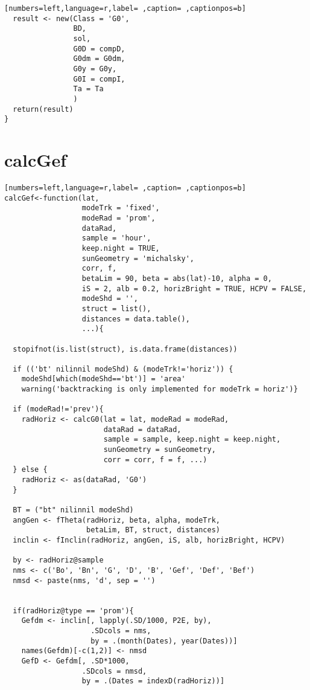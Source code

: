 \begin{lstlisting}[numbers=left,language=r,label= ,caption= ,captionpos=b]
  result <- new(Class = 'G0',
                BD,        
                sol,       
                G0D = compD, 
                G0dm = G0dm, 
                G0y = G0y,   
                G0I = compI, 
                Ta = Ta      
                )
  return(result)
}
\end{lstlisting}
\section{calcGef}
\label{sec:org979716a}
\begin{lstlisting}[numbers=left,language=r,label= ,caption= ,captionpos=b]
calcGef<-function(lat,
                  modeTrk = 'fixed',      
                  modeRad = 'prom', 
                  dataRad,
                  sample = 'hour',
                  keep.night = TRUE,
                  sunGeometry = 'michalsky',
                  corr, f,
                  betaLim = 90, beta = abs(lat)-10, alpha = 0,
                  iS = 2, alb = 0.2, horizBright = TRUE, HCPV = FALSE,
                  modeShd = '',    
                  struct = list(), 
                  distances = data.table(),
                  ...){

  stopifnot(is.list(struct), is.data.frame(distances))

  if (('bt' nilinnil modeShd) & (modeTrk!='horiz')) {
    modeShd[which(modeShd=='bt')] = 'area'
    warning('backtracking is only implemented for modeTrk = horiz')}

  if (modeRad!='prev'){ 
    radHoriz <- calcG0(lat = lat, modeRad = modeRad,
                       dataRad = dataRad,
                       sample = sample, keep.night = keep.night,
                       sunGeometry = sunGeometry,
                       corr = corr, f = f, ...)
  } else {                          
    radHoriz <- as(dataRad, 'G0') 
  } 

  BT = ("bt" nilinnil modeShd) 
  angGen <- fTheta(radHoriz, beta, alpha, modeTrk,
                   betaLim, BT, struct, distances)
  inclin <- fInclin(radHoriz, angGen, iS, alb, horizBright, HCPV)

  by <- radHoriz@sample
  nms <- c('Bo', 'Bn', 'G', 'D', 'B', 'Gef', 'Def', 'Bef')
  nmsd <- paste(nms, 'd', sep = '')


  if(radHoriz@type == 'prom'){
    Gefdm <- inclin[, lapply(.SD/1000, P2E, by),
                    .SDcols = nms,
                    by = .(month(Dates), year(Dates))]
    names(Gefdm)[-c(1,2)] <- nmsd
    GefD <- Gefdm[, .SD*1000,
                  .SDcols = nmsd,
                  by = .(Dates = indexD(radHoriz))]


\end{lstlisting}

